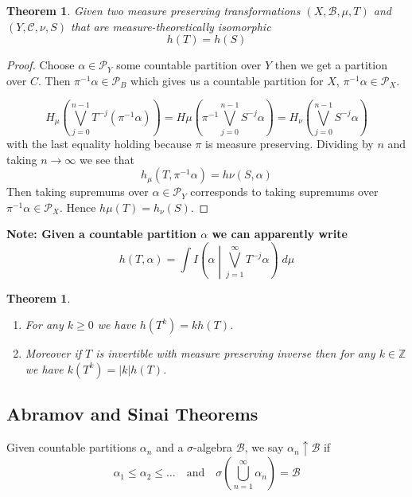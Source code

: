 \documentclass[11pt]{article}
\newcommand{\abs}[1]{\left|#1\right|}
\newcommand{\relmiddle}[1]{\mathrel{}\middle#1\mathrel{}}
\newcommand{\rmv}{\relmiddle|}
\newcommand{\Z}{\mathbb{Z}}
\newcommand{\gvn}[2]{\ensuremath{\left(#1\rmv#2\right)}}
\newcommand{\infog}[2]{\ensuremath{I\gvn{#1}{#2}}}
\newcommand{\dm}{\;d\mu}
\newenvironment{defin}
	{\begin{mdframed}[backgroundcolor=white, roundcorner=5pt, linewidth=1pt]}
	{\end{mdframed}}
\newenvironment{note}
	{\begin{mdframed}[backgroundcolor=white, linecolor=red, roundcorner=5pt, linewidth=1pt]\bfseries{Note:}\normalfont}
	{\end{mdframed}}
\newtheorem{theorem}[prop]{Theorem}
\begin{document}
\begin{theorem}
Given two measure preserving transformations $(X, \mathcal{B}, \mu, T)$ and $(Y, \mathcal{C}, \nu, S)$ that are measure-theoretically isomorphic
\[
	h(T) = h(S)
\]
\end{theorem}

\begin{proof}
Choose $\alpha\in\mathcal{P}_Y$ some countable partition over $Y$ then we get a partition over $C$.
Then $\pi^{-1}\alpha\in\mathcal{P}_B$ which gives us a countable partition for $X$, $\pi^{-1}\alpha\in\mathcal{P}_X$.

\[
	H_\mu\left( \bigvee_{j=0}^{n-1} T^{-j}(\pi^{-1}\alpha)\right) = H\mu\left( \pi^{-1}\bigvee_{j=0}^{n-1} S^{-j}\alpha\right)
	= H_\nu\left(\bigvee_{j=0}^{n-1} S^{-j}\alpha \right)
\]
with the last equality holding because $\pi$ is measure preserving.
Dividing by $n$ and taking $n\to\infty$ we see that
\[
	h_\mu(T, \pi^{-1}\alpha) = h\nu(S, \alpha)
\]
Then taking supremums over $\alpha\in\mathcal{P}_Y$ corresponds to taking supremums over $\pi^{-1}\alpha \in \mathcal{P}_X$.
Hence $h\mu(T) = h_\nu(S)$.
\end{proof}

\begin{note}
Given a countable partition $\alpha$ we can apparently write
\[
	h(T, \alpha) = \int \infog{\alpha}{\bigvee_{j=1}^\infty T^{-j}\alpha}\dm
\]
\end{note}

\begin{theorem}
\begin{enumerate}[label=(\roman*)]
	\item For any $k\geq 0$ we have $h(T^k) = kh(T)$.
	\item Moreover if $T$ is invertible with measure preserving inverse then for any $k\in \Z$ we have $k(T^k)=\abs{k}h(T)$.
\end{enumerate}
\end{theorem}

\subsection{Abramov and Sinai Theorems}

\begin{defin}
	Given countable partitions $\alpha_n$ and a $\sigma$-algebra $\mathcal{B}$, we say $\alpha_n\uparrow\mathcal{B}$ if
	\[
		\alpha_1 \leq \alpha_2 \leq \dots \quad \text{and} \quad \sigma\left( \bigcup_{n=1}^\infty \alpha_n\right)=\mathcal{B}
	\]
\end{defin}
\end{document}
